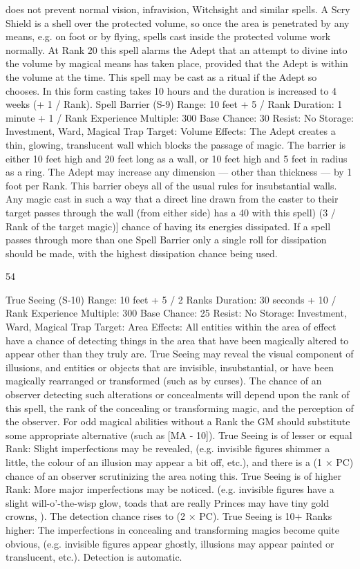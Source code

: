 \documentclass[a4paper]{article}
\begin{document}
\begin{multicols}{3}
does not prevent normal vision, infravision, Witchsight and similar spells. A Scry Shield is a shell
over the protected volume, so once the area is
penetrated by any means, e.g. on foot or by flying,
spells cast inside the protected volume work normally. At Rank 20 this spell alarms the Adept that
an attempt to divine into the volume by magical
means has taken place, provided that the Adept is
within the volume at the time. This spell may be
cast as a ritual if the Adept so chooses. In this form
casting takes 10 hours and the duration is increased
to 4 weeks (+ 1 / Rank).
Spell Barrier (S-9)
Range: 10 feet + 5 / Rank
Duration: 1 minute + 1 / Rank
Experience Multiple: 300
Base Chance: 30%
Resist: No
Storage: Investment, Ward, Magical Trap
Target: Volume
Effects: The Adept creates a thin, glowing, translucent wall which blocks the passage of magic. The
barrier is either 10 feet high and 20 feet long as a
wall, or 10 feet high and 5 feet in radius as a ring.
The Adept may increase any dimension — other
than thickness — by 1 foot per Rank. This barrier
obeys all of the usual rules for insubstantial walls.
Any magic cast in such a way that a direct line
drawn from the caster to their target passes through
the wall (from either side) has a 40%
with this spell) (3 / Rank of the target magic)]
chance of having its energies dissipated. If a spell
passes through more than one Spell Barrier only a
single roll for dissipation should be made, with the
highest dissipation chance being used.

54

True Seeing (S-10)
Range: 10 feet + 5 / 2 Ranks
Duration: 30 seconds + 10 / Rank
Experience Multiple: 300
Base Chance: 25%
Resist: No
Storage: Investment, Ward, Magical Trap
Target: Area
Effects: All entities within the area of effect have a
chance of detecting things in the area that have
been magically altered to appear other than they
truly are. True Seeing may reveal the visual component of illusions, and entities or objects that are
invisible, insubstantial, or have been magically
rearranged or transformed (such as by curses). The
chance of an observer detecting such alterations or
concealments will depend upon the rank of this
spell, the rank of the concealing or transforming
magic, and the perception of the observer. For odd
magical abilities without a Rank the GM should
substitute some appropriate alternative (such as
[MA - 10]).
True Seeing is of lesser or equal Rank: Slight
imperfections may be revealed, (e.g. invisible
figures shimmer a little, the colour of an illusion
may appear a bit off, etc.), and there is a (1 × PC)
chance of an observer scrutinizing the area noting
this.
True Seeing is of higher Rank: More major imperfections may be noticed. (e.g. invisible figures
have a slight will-o’-the-wisp glow, toads that are
really Princes may have tiny gold crowns, ). The
detection chance rises to (2 × PC).
True Seeing is 10+ Ranks higher: The imperfections in concealing and transforming magics become quite obvious, (e.g. invisible figures appear
ghostly, illusions may appear painted or translucent, etc.). Detection is automatic.


\end{multicols}
\end{document}
